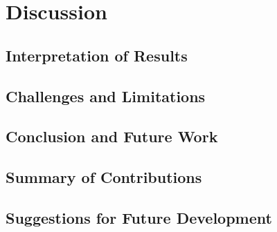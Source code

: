 \chapter{Discussion}
  \label{sec:discussion}

  \section{Interpretation of Results}
  \label{subsec:interpretation-results}

  \section{Challenges and Limitations}
  \label{subsec:challenges-limitations}

  \section{Conclusion and Future Work}
  \label{sec:conclusion}

  \section{Summary of Contributions}
  \label{subsec:summary-contributions}

  \section{Suggestions for Future Development}
  \label{subsec:suggestions-future-development}